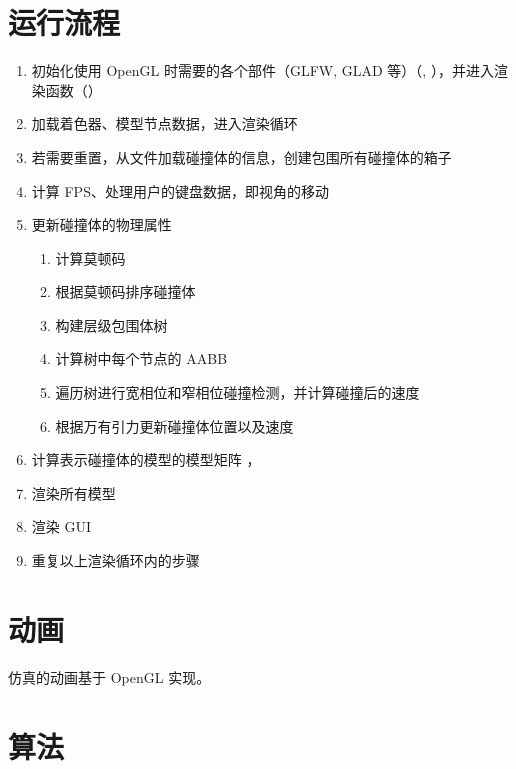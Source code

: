\section{运行流程}

\begin{enumerate}
    \item 初始化使用 OpenGL 时需要的各个部件（GLFW, GLAD 等）（, ），并进入渲染函数（）
    \item 加载着色器、模型节点数据，进入渲染循环
    \item 若需要重置，从文件加载碰撞体的信息，创建包围所有碰撞体的箱子
    \item 计算 FPS、处理用户的键盘数据，即视角的移动
    \item 更新碰撞体的物理属性 
    \begin{enumerate}
        \item 计算莫顿码 
        \item 根据莫顿码排序碰撞体
        \item 构建层级包围体树 
        \item 计算树中每个节点的 AABB 
        \item 遍历树进行宽相位和窄相位碰撞检测，并计算碰撞后的速度 
        \item 根据万有引力更新碰撞体位置以及速度 
    \end{enumerate}
    \item 计算表示碰撞体的模型的模型矩阵 ，
    \item 渲染所有模型
    \item 渲染 GUI
    \item 重复以上渲染循环内的步骤
\end{enumerate}



\section{动画}

仿真的动画基于 OpenGL 实现。


\section{算法}

